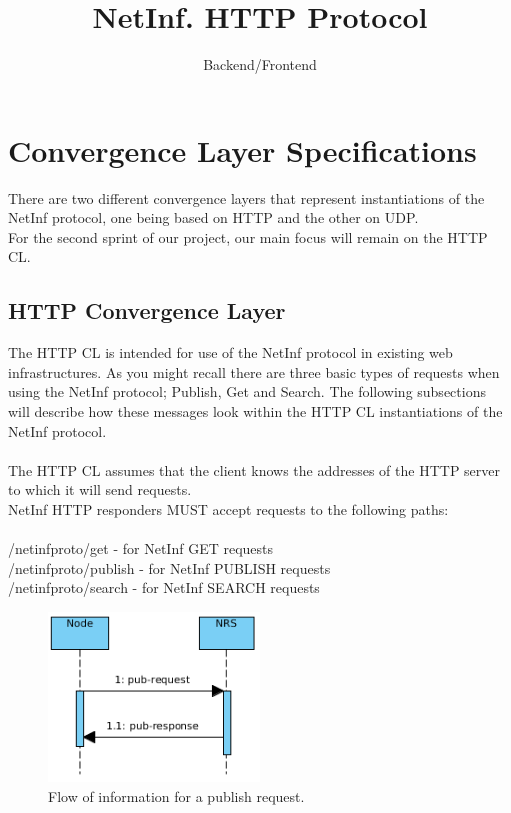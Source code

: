 \documentclass[11pt]{article}
\title{\textbf{NetInf. HTTP Protocol}}
\author{Backend/Frontend}
\date{}
\begin{document}
\maketitle
\clearpage
\tableofcontents
\clearpage

\section{Convergence Layer Specifications}
There are two different convergence layers that represent instantiations of the NetInf protocol, one being based on HTTP and the other on UDP.\\
For the second sprint of our project, our main focus will remain on the HTTP CL.

\subsection{HTTP Convergence Layer}
The HTTP CL is intended for use of the NetInf protocol in existing web infrastructures.
As you might recall there are three basic types of requests when using the NetInf protocol; Publish, Get and Search.
The following subsections will describe how these messages look within the HTTP CL instantiations of the NetInf protocol.
\\ \\
The HTTP CL assumes that the client knows the addresses of the HTTP server to which it will send requests.\\
NetInf HTTP responders MUST accept requests to the following paths:\\ \\
/netinfproto/get - for NetInf GET requests\\
/netinfproto/publish - for NetInf PUBLISH requests\\
/netinfproto/search - for NetInf SEARCH requests\\

\begin{figure}[H]
\centering
\includegraphics[width=0.5\textwidth]{seq_pub.png}
\caption{Flow of information for a publish request.}
\label{fig:sequence_get}
\end{figure}
\end{document}
